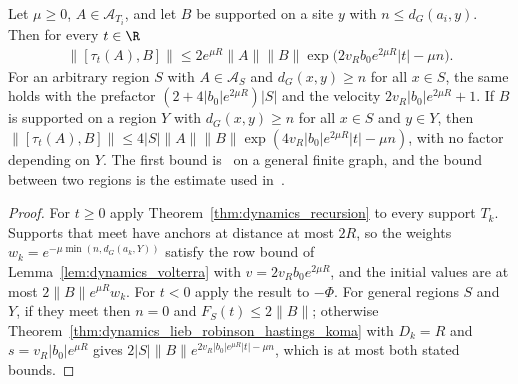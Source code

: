 \begin{theorem}
    \label{thm:dynamics_lieb_robinson}
    \leanok
    Let $\mu\geq0$, $A\in\mathcal A_{T_i}$, and let $B$ be supported on a site $y$
    with $n\leq d_G(a_i,y)$. Then for every $t\in\R$
    \begin{align*}
        \lVert[\tau_t(A),B]\rVert\leq2e^{\mu R}\lVert A\rVert\lVert B\rVert
            \exp\bigl(2v_Rb_0e^{2\mu R}|t|-\mu n\bigr).
    \end{align*}
    For an arbitrary region $S$ with $A\in\mathcal A_S$ and $d_G(x,y)\geq n$ for
    all $x\in S$, the same holds with the prefactor
    $(2+4|b_0|e^{2\mu R})|S|$ and the velocity $2v_R|b_0|e^{2\mu R}+1$. If
    $B$ is supported on a region $Y$ with $d_G(x,y)\geq n$ for
    all $x\in S$ and $y\in Y$, then
    $\lVert[\tau_t(A),B]\rVert\leq4|S|\lVert A\rVert\lVert B\rVert
    \exp(4v_R|b_0|e^{2\mu R}|t|-\mu n)$, with no factor depending on $Y$.
    The first bound is~\cite[Lemma~4.1]{OpenAI2026AreaLaw} on a general finite
    graph, and the bound between two regions is the estimate used
    in~\cite{Hastings2007AreaLaw}.
\end{theorem}
\begin{proof}\leanok
    For $t\geq0$ apply Theorem~\ref{thm:dynamics_recursion} to every support
    $T_k$. Supports that meet have anchors at distance at most $2R$, so the
    weights $w_k=e^{-\mu\min(n,d_G(a_k,Y))}$ satisfy the row bound of
    Lemma~\ref{lem:dynamics_volterra} with $v=2v_Rb_0e^{2\mu R}$, and the
    initial values are at most $2\lVert B\rVert e^{\mu R}w_k$. For $t<0$ apply
    the result to $-\Phi$. For general regions $S$ and $Y$, if they meet then
    $n=0$ and $F_S(t)\leq2\lVert B\rVert$; otherwise
    Theorem~\ref{thm:dynamics_lieb_robinson_hastings_koma} with $D_k=R$ and
    $s=v_R|b_0|e^{\mu R}$ gives
    $2\lvert S\rvert\lVert B\rVert e^{2v_R|b_0|e^{\mu R}|t|-\mu n}$, which is at
    most both stated bounds.
\end{proof}

